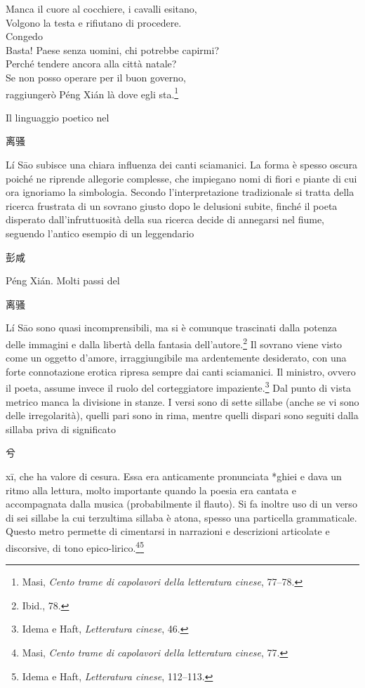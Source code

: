 \documentclass[12pt,titlepage]{article}
\begin{document}
\vspace{-1.5em}
\begin{center}
Manca il cuore al cocchiere, i cavalli esitano,\\
Volgono la testa e rifiutano di procedere.\\
Congedo\\
Basta! Paese senza uomini, chi potrebbe capirmi?\\
Perché tendere ancora alla città natale?\\
Se non posso operare per il buon governo,\\
raggiungerò Péng Xián là dove egli sta.\footnote{Masi, \emph{Cento trame di capolavori della letteratura cinese}, 77–78.}\\
\end{center}
Il linguaggio poetico nel 
 \begin{CJK*}{UTF8}{gbsn}
 离骚 
 \end{CJK*} 
 Lí Sāo subisce una chiara influenza dei canti sciamanici. La forma è spesso oscura poiché ne riprende allegorie complesse, che impiegano nomi di fiori e piante di cui ora ignoriamo la simbologia. Secondo l'interpretazione tradizionale si tratta della ricerca frustrata di un sovrano giusto dopo le delusioni subite, finché il poeta disperato dall'infruttuosità della sua ricerca decide di annegarsi nel fiume, seguendo l'antico esempio di un leggendario 
 \begin{CJK*}{UTF8}{gbsn}彭咸 \end{CJK*} Péng Xián. Molti passi del \begin{CJK*}{UTF8}{gbsn}离骚 \end{CJK*} Lí Sāo sono quasi incomprensibili, ma si è comunque trascinati dalla potenza delle immagini e dalla libertà della fantasia dell'autore.\footnote{Ibid., 78.} Il sovrano viene visto come un oggetto d'amore, irraggiungibile ma ardentemente desiderato, con una forte connotazione erotica ripresa sempre dai canti sciamanici. Il ministro, ovvero il poeta, assume invece il ruolo del corteggiatore impaziente.\footnote{Idema e Haft, \emph{Letteratura cinese}, 46.}
Dal punto di vista metrico manca la divisione in stanze. I versi sono di sette sillabe (anche se vi sono delle irregolarità), quelli pari sono in rima, mentre quelli dispari sono seguiti dalla sillaba priva di significato 
\begin{CJK*}{UTF8}{gbsn}兮 \end{CJK*}
xī, che ha valore di cesura. Essa era anticamente pronunciata *ghiei e dava un ritmo alla lettura, molto importante quando la poesia era cantata e accompagnata dalla musica (probabilmente il flauto). Si fa inoltre uso di un verso di sei sillabe la cui terzultima sillaba è atona, spesso una particella grammaticale. Questo metro permette di cimentarsi in narrazioni e descrizioni articolate e discorsive, di tono epico-lirico.\footnote{Masi, \emph{Cento trame di capolavori della letteratura cinese}, 77.}\footnote{Idema e Haft, \emph{Letteratura cinese}, 112–113.}
\end{document}

